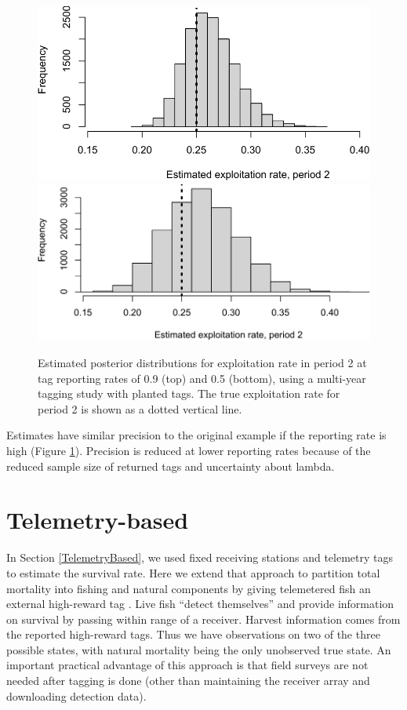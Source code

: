 \documentclass[
]{krantz}
\begin{document}
\begin{figure}
\includegraphics[width=0.9\linewidth]{bookdown_files/figure-latex/BrowniePlot-1} \includegraphics[width=0.9\linewidth]{bookdown_files/figure-latex/BrowniePlot-2} \caption{Estimated posterior distributions for exploitation rate in period 2 at tag reporting rates of 0.9 (top) and 0.5 (bottom), using a multi-year tagging study with planted tags. The true exploitation rate for period 2 is shown as a dotted vertical line.}\label{fig:BrowniePlot}
\end{figure}

Estimates have similar precision to the original example if the reporting rate is high (Figure \ref{fig:BrowniePlot}). Precision is reduced at lower reporting rates because of the reduced sample size of returned tags and uncertainty about lambda.

\hypertarget{TelemetryFandM}{%
\section{Telemetry-based}\label{TelemetryFandM}}

In Section \ref{TelemetryBased}, we used fixed receiving stations and telemetry tags to estimate the survival rate. Here we extend that approach to partition total mortality into fishing and natural components by giving telemetered fish an external high-reward tag \citep[Design C of][]{hightower.harris_2017}. Live fish ``detect themselves'' and provide information on survival by passing within range of a receiver. Harvest information comes from the reported high-reward tags. Thus we have observations on two of the three possible states, with natural mortality being the only unobserved true state. An important practical advantage of this approach is that field surveys are not needed after tagging is done (other than maintaining the receiver array and downloading detection data).
\end{document}
